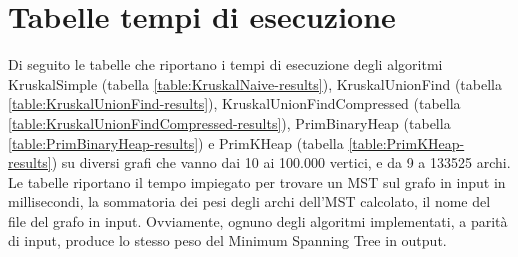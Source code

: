 \appendix
\section{Tabelle tempi di esecuzione}
\label{cap:runtime-tables}

Di seguito le tabelle che riportano i tempi di esecuzione degli
algoritmi KruskalSimple (tabella \ref{table:KruskalNaive-results}),
KruskalUnionFind (tabella \ref{table:KruskalUnionFind-results}),
KruskalUnionFindCompressed
(tabella \ref{table:KruskalUnionFindCompressed-results}),
PrimBinaryHeap (tabella \ref{table:PrimBinaryHeap-results}) e
PrimKHeap (tabella \ref{table:PrimKHeap-results}) su diversi grafi che
vanno dai 10 ai 100.000 vertici, e da 9 a 133525 archi. \\

\noindent Le tabelle riportano il tempo impiegato per trovare un MST
sul grafo in input in millisecondi, la sommatoria dei pesi degli archi
dell'MST calcolato, il nome del file del grafo in input. Ovviamente,
ognuno degli algoritmi implementati, a parità di input, produce lo
stesso peso del Minimum Spanning Tree in output.

